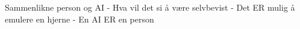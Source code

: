 Sammenlikne person og AI
- Hva vil det si å være selvbevist
- Det ER mulig å emulere en hjerne
- En AI ER en person
